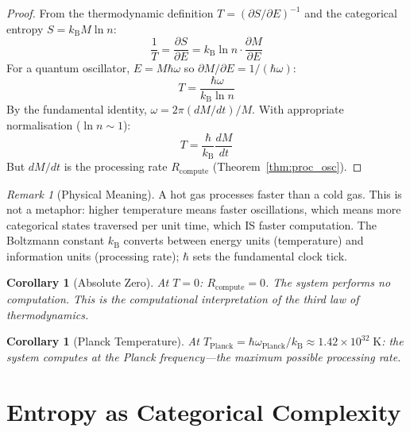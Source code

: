 \documentclass[twocolumn,10pt,a4paper]{article}
\theoremstyle{plain}
\newtheorem{corollary}[theorem]{Corollary}
\theoremstyle{definition}
\theoremstyle{remark}
\newtheorem{remark}[theorem]{Remark}
\newcommand{\kB}{k_{\mathrm{B}}}
\begin{document}
\begin{proof}
From the thermodynamic definition $T = (\partial S / \partial E)^{-1}$ and the categorical entropy $S = \kB M \ln n$:
\begin{equation}
    \frac{1}{T} = \frac{\partial S}{\partial E} = \kB \ln n \cdot \frac{\partial M}{\partial E}
\end{equation}
For a quantum oscillator, $E = M\hbar\omega$ so $\partial M/\partial E = 1/(\hbar\omega)$:
\begin{equation}
    T = \frac{\hbar\omega}{\kB \ln n}
\end{equation}
By the fundamental identity, $\omega = 2\pi(dM/dt)/M$. With appropriate normalisation ($\ln n \sim 1$):
\begin{equation}
    T = \frac{\hbar}{\kB}\frac{dM}{dt}
\end{equation}
But $dM/dt$ is the processing rate $R_{\mathrm{compute}}$ (Theorem~\ref{thm:proc_osc}).
\end{proof}

\begin{remark}[Physical Meaning]
A hot gas processes faster than a cold gas. This is not a metaphor: higher temperature means faster oscillations, which means more categorical states traversed per unit time, which IS faster computation. The Boltzmann constant $\kB$ converts between energy units (temperature) and information units (processing rate); $\hbar$ sets the fundamental clock tick.
\end{remark}

\begin{corollary}[Absolute Zero]
At $T = 0$: $R_{\mathrm{compute}} = 0$. The system performs no computation. This is the computational interpretation of the third law of thermodynamics.
\end{corollary}

\begin{corollary}[Planck Temperature]
At $T_{\mathrm{Planck}} = \hbar\omega_{\mathrm{Planck}}/\kB \approx 1.42 \times 10^{32}\;\mathrm{K}$: the system computes at the Planck frequency---the maximum possible processing rate.
\end{corollary}

\section{Entropy as Categorical Complexity}
\label{sec:entropy_complexity}
\end{document}
